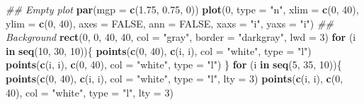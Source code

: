 \documentclass[]{article}
\newenvironment{Shaded}{\begin{snugshade}}{\end{snugshade}}
\newcommand{\CommentTok}[1]{\textcolor[rgb]{0.56,0.35,0.01}{\textit{#1}}}
\newcommand{\ControlFlowTok}[1]{\textcolor[rgb]{0.13,0.29,0.53}{\textbf{#1}}}
\newcommand{\DataTypeTok}[1]{\textcolor[rgb]{0.13,0.29,0.53}{#1}}
\newcommand{\DecValTok}[1]{\textcolor[rgb]{0.00,0.00,0.81}{#1}}
\newcommand{\FloatTok}[1]{\textcolor[rgb]{0.00,0.00,0.81}{#1}}
\newcommand{\KeywordTok}[1]{\textcolor[rgb]{0.13,0.29,0.53}{\textbf{#1}}}
\newcommand{\NormalTok}[1]{#1}
\newcommand{\OtherTok}[1]{\textcolor[rgb]{0.56,0.35,0.01}{#1}}
\newcommand{\StringTok}[1]{\textcolor[rgb]{0.31,0.60,0.02}{#1}}
\begin{document}
\begin{Shaded}
\begin{Highlighting}[]
\CommentTok{## Empty plot}
\KeywordTok{par}\NormalTok{(}\DataTypeTok{mgp =} \KeywordTok{c}\NormalTok{(}\FloatTok{1.75}\NormalTok{, }\FloatTok{0.75}\NormalTok{, }\DecValTok{0}\NormalTok{))}
\KeywordTok{plot}\NormalTok{(}\DecValTok{0}\NormalTok{, }\DataTypeTok{type =} \StringTok{"n"}\NormalTok{, }\DataTypeTok{xlim =} \KeywordTok{c}\NormalTok{(}\DecValTok{0}\NormalTok{, }\DecValTok{40}\NormalTok{), }\DataTypeTok{ylim =} \KeywordTok{c}\NormalTok{(}\DecValTok{0}\NormalTok{, }\DecValTok{40}\NormalTok{), }\DataTypeTok{axes =} \OtherTok{FALSE}\NormalTok{, }\DataTypeTok{ann =} \OtherTok{FALSE}\NormalTok{, }\DataTypeTok{xaxs =} \StringTok{"i"}\NormalTok{, }\DataTypeTok{yaxs =} \StringTok{"i"}\NormalTok{)}
\CommentTok{## Background}
\KeywordTok{rect}\NormalTok{(}\DecValTok{0}\NormalTok{, }\DecValTok{0}\NormalTok{, }\DecValTok{40}\NormalTok{, }\DecValTok{40}\NormalTok{, }\DataTypeTok{col =} \StringTok{"gray"}\NormalTok{, }\DataTypeTok{border =} \StringTok{"darkgray"}\NormalTok{, }\DataTypeTok{lwd =} \DecValTok{3}\NormalTok{)}
\ControlFlowTok{for}\NormalTok{ (i }\ControlFlowTok{in} \KeywordTok{seq}\NormalTok{(}\DecValTok{10}\NormalTok{, }\DecValTok{30}\NormalTok{, }\DecValTok{10}\NormalTok{))\{}
  \KeywordTok{points}\NormalTok{(}\KeywordTok{c}\NormalTok{(}\DecValTok{0}\NormalTok{, }\DecValTok{40}\NormalTok{), }\KeywordTok{c}\NormalTok{(i, i), }\DataTypeTok{col =} \StringTok{"white"}\NormalTok{, }\DataTypeTok{type =} \StringTok{"l"}\NormalTok{)}
  \KeywordTok{points}\NormalTok{(}\KeywordTok{c}\NormalTok{(i, i), }\KeywordTok{c}\NormalTok{(}\DecValTok{0}\NormalTok{, }\DecValTok{40}\NormalTok{), }\DataTypeTok{col =} \StringTok{"white"}\NormalTok{, }\DataTypeTok{type =} \StringTok{"l"}\NormalTok{)}
\NormalTok{\}}
\ControlFlowTok{for}\NormalTok{ (i }\ControlFlowTok{in} \KeywordTok{seq}\NormalTok{(}\DecValTok{5}\NormalTok{, }\DecValTok{35}\NormalTok{, }\DecValTok{10}\NormalTok{))\{}
  \KeywordTok{points}\NormalTok{(}\KeywordTok{c}\NormalTok{(}\DecValTok{0}\NormalTok{, }\DecValTok{40}\NormalTok{), }\KeywordTok{c}\NormalTok{(i, i), }\DataTypeTok{col =} \StringTok{"white"}\NormalTok{, }\DataTypeTok{type =} \StringTok{"l"}\NormalTok{, }\DataTypeTok{lty =} \DecValTok{3}\NormalTok{)}
  \KeywordTok{points}\NormalTok{(}\KeywordTok{c}\NormalTok{(i, i), }\KeywordTok{c}\NormalTok{(}\DecValTok{0}\NormalTok{, }\DecValTok{40}\NormalTok{), }\DataTypeTok{col =} \StringTok{"white"}\NormalTok{, }\DataTypeTok{type =} \StringTok{"l"}\NormalTok{, }\DataTypeTok{lty =} \DecValTok{3}\NormalTok{)}

\end{Highlighting}
\end{Shaded}
\end{document}
